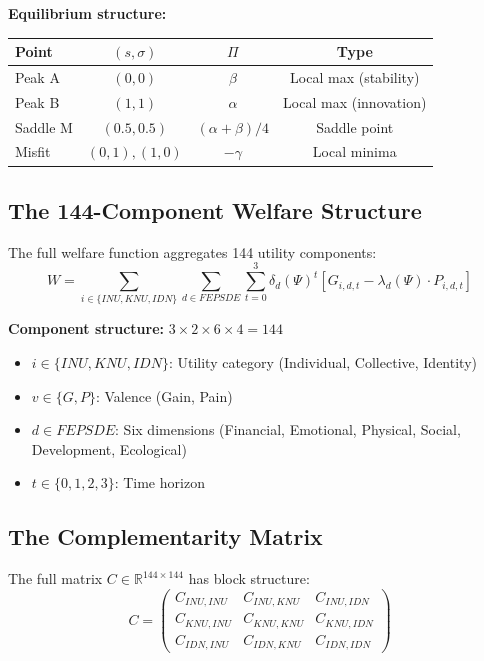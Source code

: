 \textbf{Equilibrium structure:}
\begin{center}
\renewcommand{\arraystretch}{1.2}
\begin{tabular}{@{}lccc@{}}
\toprule
\textbf{Point} & $(s, \sigma)$ & $\Pi$ & \textbf{Type} \\
\midrule
Peak A & $(0, 0)$ & $\beta$ & Local max (stability) \\
Peak B & $(1, 1)$ & $\alpha$ & Local max (innovation) \\
Saddle M & $(0.5, 0.5)$ & $(\alpha+\beta)/4$ & Saddle point \\
Misfit & $(0, 1), (1, 0)$ & $-\gamma$ & Local minima \\
\bottomrule
\end{tabular}
\end{center}

\subsection{The 144-Component Welfare Structure}

The full welfare function aggregates 144 utility components:
\begin{equation}
W = \sum_{i \in \{INU, KNU, IDN\}} \sum_{d \in FEPSDE} \sum_{t=0}^{3}
    \delta_d(\Psi)^t \left[ G_{i,d,t} - \lambda_d(\Psi) \cdot P_{i,d,t} \right]
\label{eq:mp-144-welfare}
\end{equation}

\textbf{Component structure:} $3 \times 2 \times 6 \times 4 = 144$
\begin{itemize}[nosep]
\item $i \in \{INU, KNU, IDN\}$: Utility category (Individual, Collective, Identity)
\item $v \in \{G, P\}$: Valence (Gain, Pain)
\item $d \in FEPSDE$: Six dimensions (Financial, Emotional, Physical, Social, Development, Ecological)
\item $t \in \{0,1,2,3\}$: Time horizon
\end{itemize}

\subsection{The Complementarity Matrix}

The full matrix $C \in \mathbb{R}^{144 \times 144}$ has block structure:
\begin{equation}
C = \begin{pmatrix}
  C_{INU,INU} & C_{INU,KNU} & C_{INU,IDN} \\
  C_{KNU,INU} & C_{KNU,KNU} & C_{KNU,IDN} \\
  C_{IDN,INU} & C_{IDN,KNU} & C_{IDN,IDN}
\end{pmatrix}
\label{eq:mp-block-matrix}
\end{equation}

